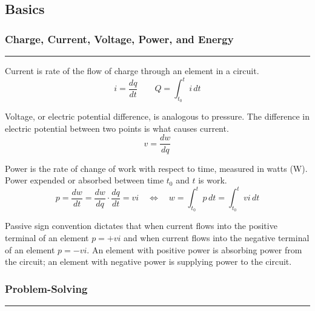 \documentclass{article}
\begin{document}
    \tableofcontents
    \pagebreak


    \begin{center}
        \subsection*{Basics}
    \end{center}

    \medskip
    \subsubsection*{Charge, Current, Voltage, Power, and Energy}
    \vspace{-1em}
    \rule{\linewidth}{0.1mm}

    \vspace{0.2em}\noindent
    Current is rate of the flow of charge through an element in a circuit.
    \[
        i = \frac{dq}{dt} \qquad Q = \int_{t_0}^t i\,dt
    \]

    \vspace{.2em}\noindent
    Voltage, or electric potential difference, is analogous to pressure.
    The difference in electric potential between two points is what causes current.
    \[
        v = \frac{dw}{dq}
    \]

    \vspace{.2em}\noindent
    Power is the rate of change of work with respect to time, measured in watts (W). Power expended or absorbed between time $t_0$ and $t$ is work.
    \[
        p = \frac{dw}{dt} = \frac{dw}{dq} \cdot \frac{dq}{dt} = vi
        \quad \Longleftrightarrow \quad
        w=\int_{t_0}^t p\,dt = \int_{t_0}^t vi \,dt
    \]

    \vspace{.2em}\noindent
    Passive sign convention dictates that when current flows into the positive terminal of an element $p = +vi$ and when current flows into the negative terminal of an element $p = -vi$.
    An element with positive power is absorbing power from the circuit; an element with negative power is supplying power to the circuit.

    \vspace{4em}
    \smallskip
    \subsubsection*{Problem-Solving}
    \vspace{-1em}
    \rule{\linewidth}{0.1mm}
\end{document}
